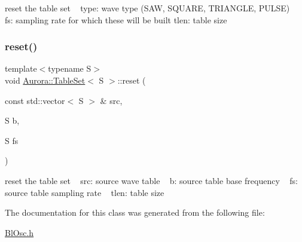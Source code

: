 reset the table set ~\newline
type\+: wave type (S\+AW, S\+Q\+U\+A\+RE, T\+R\+I\+A\+N\+G\+LE, P\+U\+L\+SE) ~\newline
fs\+: sampling rate for which these will be built tlen\+: table size \mbox{\label{class_aurora_1_1_table_set_afec852dca45285ec57b6a4a97dffac36}} 
\subsubsection{\texorpdfstring{reset()}{reset()}\hspace{0.1cm}{\footnotesize\ttfamily [2/2]}}
{\footnotesize\ttfamily template$<$typename S$>$ \\
void \hyperlink{class_aurora_1_1_table_set}{Aurora\+::\+Table\+Set}$<$ S $>$\+::reset (\begin{DoxyParamCaption}\item[{const std\+::vector$<$ S $>$ \&}]{src,  }\item[{S}]{b,  }\item[{S}]{fs }\end{DoxyParamCaption})\hspace{0.3cm}{\ttfamily [inline]}}

reset the table set ~\newline
src\+: source wave table ~\newline
b\+: source table base frequency ~\newline
fs\+: source table sampling rate ~\newline
tlen\+: table size 

The documentation for this class was generated from the following file\+:\begin{DoxyCompactItemize}
\item 
\hyperlink{_bl_osc_8h}{Bl\+Osc.\+h}\end{DoxyCompactItemize}
